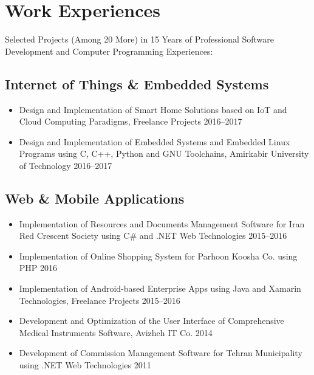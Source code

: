 \documentclass{cv}
\begin{document}

\section{Work Experiences}


Selected Projects (Among 20 More) in 15 Years of Professional Software Development and Computer Programming Experiences:

\subsection{Internet of Things \& Embedded Systems}

\begin{itemize}

\item
Design and Implementation of Smart Home Solutions based on IoT and Cloud Computing Paradigms, Freelance Projects \hfill 2016--2017
\item
Design and Implementation of Embedded Systems and Embedded Linux Programs using C, C++, Python and GNU Toolchains, Amirkabir University of Technology \hfill 2016--2017

\end{itemize}


\subsection{Web \& Mobile Applications}

\begin{itemize}

\item
Implementation of Resources and Documents Management Software for Iran Red Crescent Society using C\# and .NET Web Technologies \hfill 2015--2016
\item
Implementation of Online Shopping System for Parhoon Koosha Co. using PHP \hfill 2016
\item
Implementation of Android-based Enterprise Apps using Java and Xamarin Technologies, Freelance Projects \hfill 2015--2016
\item
Development and Optimization of the User Interface of Comprehensive Medical Instruments Software, Avizheh IT Co. \hfill 2014
\item
Development of Commission Management Software for Tehran Municipality using .NET Web Technologies \hfill 2011

\end{itemize}
\end{document}

